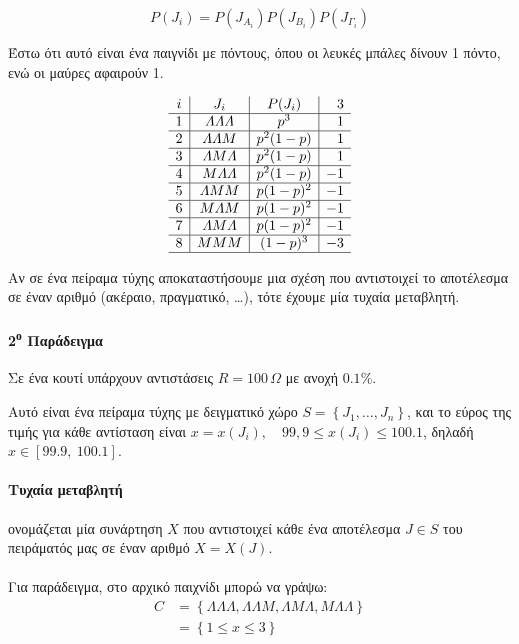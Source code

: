 \documentclass[11pt,a4paper,notitlepage,fleqn,final]{article}
\begin{document}
	\[
	P(J_i) = P(J_{A_i}) P(J_{B_i}) P(J_{\varGamma_i})
	\]
	
	Έστω ότι αυτό είναι ένα παιγνίδι με πόντους, όπου οι λευκές μπάλες
	δίνουν 1 πόντο, ενώ οι μαύρες αφαιρούν 1.
	
	\[
	\begin{array}{c|c|c|r}
		i &              J_i               &  P(J_i)  & 3 \\ \hline
		1 & \varLambda\varLambda\varLambda &   p^3    & 1 \\ \hline
		2 &     \varLambda\varLambda M     & p^2(1-p) & 1 \\ \hline
		3 &    \varLambda M \varLambda     & p^2(1-p) & 1 \\ \hline
		4 &     M\varLambda\varLambda      & p^2(1-p) & -1 \\ \hline
		5 &         \varLambda M M         & p(1-p)^2 & -1 \\ \hline
		6 &         M \varLambda M         & p(1-p)^2 & -1 \\ \hline
		7 &    \varLambda M \varLambda     & p(1-p)^2 & -1 \\ \hline
		8 &             M M M              & (1-p)^3  & -3 \\ \hline
	\end{array}
	\]
	
	Αν σε ένα πείραμα τύχης αποκαταστήσουμε μια σχέση που αντιστοιχεί
	το αποτέλεσμα σε έναν αριθμό (ακέραιο, πραγματικό, \dots), τότε
	έχουμε μία τυχαία μεταβλητή.
	
	\paragraph{2\textsuperscript{ο} Παράδειγμα}
	Σε ένα κουτί υπάρχουν αντιστάσεις \( R= 100\, \Omega \)
	με ανοχή \( 0.1\% \).
	
	Αυτό είναι ένα πείραμα τύχης με δειγματικό χώρο
	\( S = \left\lbrace J_1,\dots,J_n \right\rbrace \), και το εύρος
	της τιμής για κάθε αντίσταση είναι \( x=x(J_i), \quad
	99,9 \leq x(J_i) \leq 100.1 \), δηλαδή \( x \in [99.9,\ 100.1] \).
	
	\paragraph{Τυχαία μεταβλητή} ονομάζεται μία συνάρτηση \( X \)
	που αντιστοιχεί κάθε ένα αποτέλεσμα \( J \in S \) του πειράματός μας
	σε έναν αριθμό \( X=X(J) \).
	
	\paragraph{}
	Για παράδειγμα, στο αρχικό παιχνίδι μπορώ να γράψω:
	\begin{align*}
		C &= \left\lbrace \varLambda\varLambda\varLambda,
		\varLambda\varLambda M, \varLambda M \varLambda,
		M\varLambda\varLambda \right\rbrace
		\\ &= \left\lbrace 1 \leq x \leq 3 \right\rbrace
	\end{align*}
	
\end{document}
